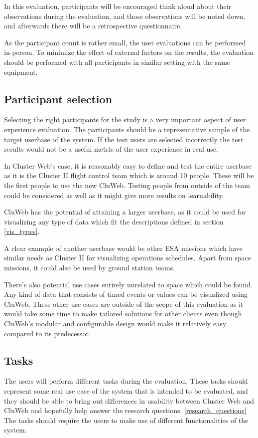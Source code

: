 In this evaluation, participants will be encouraged think aloud about their observations during the evaluation, and those observations will be noted down, and afterwards there will be a retrospective questionnaire.

As the participant count is rather small, the user evaluations can be performed in-person. To minimize the effect of external factors on the results, the evaluation should be performed with all participants in similar setting with the same equipment.

\subsection{Participant selection}
Selecting the right participants for the study is a very important aspect of user experience evaluation. The participants should be a representative sample of the target userbase of the system. If the test users are selected incorrectly the test results would not be a useful metric of the user experience in real use.

In Cluster Web's case, it is reasonably easy to  define and test the entire userbase as it is the Cluster II flight control team which is around 10 people. These will be the  first people to use the new CluWeb. Testing people from outside of the team could be considered as well as it might give more results on learnability.

CluWeb has the potential of attaining a larger userbase, as it could be used for visualizing any type of data which fit the descriptions defined in section \ref{vis_types}. 

A clear example of another userbase would be other ESA missions which have similar needs as Cluster II for visualizing operations schedules. Apart from space missions, it could also be used by ground station teams.

There's also potential use cases entirely unrelated to space which could be found. Any kind of data that consists of timed events or values can be visualized using CluWeb. These other use cases are outside of the scope of this evaluation as it would take some time to make tailored solutions for other clients even though CluWeb's modular and configurable design would make it relatively easy compared to its predecessor.

\cite{rubin2008handbook, albert2013measuring}

\subsection{Tasks}
The users will perform different tasks during the evaluation. These tasks should represent some real use case of the system that is intended to be evaluated, and they should be able to bring out differences in usability between Cluster Web and CluWeb and hopefully help answer the research questions. \ref{research_questions} The tasks should require the users to make use of different functionalities of the system.

